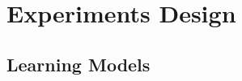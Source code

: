 \documentclass[10pt,journal]{IEEEtran}%
\begin{document}






\section{Experiments Design}
\label{sec:exdes}
\subsection{Learning Models}
\end{document}
